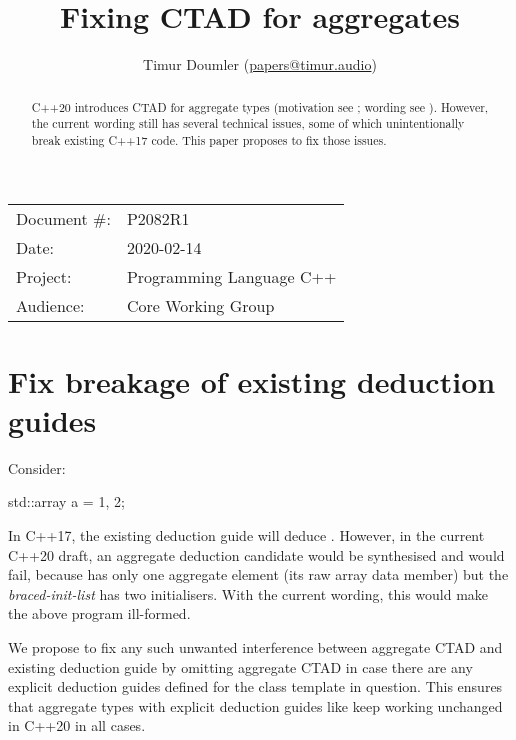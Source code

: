 

\newcommand{\forceindent}{\parindent=1em\indent\parindent=0pt\relax} %



\title{Fixing CTAD for aggregates}
\author{
  Timur Doumler \small(\href{mailto:papers@timur.audio}{papers@timur.audio})
}
\date{}
\maketitle

\begin{tabular}{ll}
Document \#: & P2082R1 \\
Date: & 2020-02-14\\
Project: & Programming Language C++ \\
Audience: & Core Working Group
\end{tabular}


\begin{abstract}
C++20 introduces CTAD for aggregate types (motivation see \cite{P1021R5}; wording see \cite{P1816R0}). However, the current wording still has several technical issues, some of which unintentionally break existing C++17 code. This paper proposes to fix those issues.
\end{abstract}

\vspace{4mm} 

\section{Fix breakage of existing deduction guides}
Consider:
\begin{codeblock}
std::array a = {1, 2};
\end{codeblock}
 In C++17, the existing deduction guide will deduce . However, in the current C++20 draft, an aggregate deduction candidate would be synthesised and would fail, because  has only one aggregate element (its raw array data member) but the \emph{braced-init-list} has two initialisers. With the current wording, this would make the above program ill-formed.

We propose to fix any such unwanted interference between aggregate CTAD and existing deduction guide by omitting aggregate CTAD in case there are any explicit deduction guides defined for the class template in question. This ensures that aggregate types with explicit deduction guides like  keep working unchanged in C++20 in all cases.

